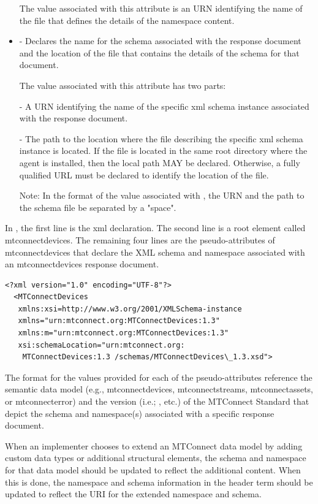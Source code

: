 \documentclass{mtconnect}	%
\begin{document}
\begin{itemize}
The value associated with this attribute is an URN identifying the name of the file that defines the details of the \gls{namespace} content.

\item {} -  Declares the name for the \gls{schema} associated with the \gls{response document} and the location of the file that contains the details of the \gls{schema} for that document.

The value associated with this attribute has two parts:

\tab - A URN identifying the name of the specific \gls{xml schema} instance associated with the \gls{response document}.

\tab - The path to the location where the file describing the specific \gls{xml schema} instance is located.  If the file is located in the same root directory where the \gls{agent} is installed, then the local path MAY be declared.  Otherwise, a fully qualified URL must be declared to identify the location of the file.

\begin{note}
Note:	In the format of the value associated with , the URN and the path to the \gls{schema} file \MUST be separated by a "space".
\end{note}

\end{itemize}

In , the first line is the \gls{xml declaration}.  The second line is a \gls{root element} called \gls{mtconnectdevices}.  The remaining four lines are the pseudo-attributes of \gls{mtconnectdevices} that declare the XML \gls{schema} and \gls{namespace} associated with an \gls{mtconnectdevices response document}.

\begin{lstlisting}[firstnumber=1,escapechar=|,%
    caption={Example of schema and namespace declaration}, label={lst:schema-and-namespace-declaration}]
<?xml version="1.0" encoding="UTF-8"?>
  <MTConnectDevices
   xmlns:xsi=http://www.w3.org/2001/XMLSchema-instance
   xmlns="urn:mtconnect.org:MTConnectDevices:1.3"
   xmlns:m="urn:mtconnect.org:MTConnectDevices:1.3"
   xsi:schemaLocation="urn:mtconnect.org:
    MTConnectDevices:1.3 /schemas/MTConnectDevices\_1.3.xsd">
\end{lstlisting}

The format for the values provided for each of the pseudo-attributes \MUST reference the \gls{semantic data model} (e.g., \gls{mtconnectdevices}, \gls{mtconnectstreams}, \gls{mtconnectassets}, or \gls{mtconnecterror}) and the version (i.e.; , etc.) of the MTConnect Standard that depict the \gls{schema} and \gls{namespace}(s) associated with a specific \gls{response document}.

When an implementer chooses to extend an MTConnect \gls{data model} by adding custom data types or additional \glspl{structural element}, the \gls{schema} and \gls{namespace} for that \gls{data model} should be updated to reflect the additional content.  When this is done, the \gls{namespace} and \gls{schema} information in the \gls{header term} should be updated to reflect the URI for the extended \gls{namespace} and \gls{schema}. 
\end{document}
